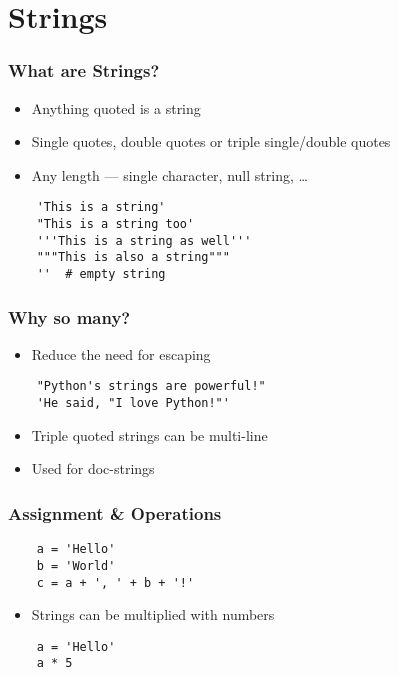 \section{Strings}

\begin{frame}[fragile]
  \frametitle{What are Strings?}
  \begin{itemize}
  \item Anything quoted is a string
  \item Single quotes, double quotes or triple single/double quotes
  \item Any length --- single character, null string, \ldots
  \end{itemize}
  \begin{lstlisting}
    'This is a string'
    "This is a string too'
    '''This is a string as well'''
    """This is also a string"""
    ''  # empty string
  \end{lstlisting}
\end{frame}

\begin{frame}[fragile]
  \frametitle{Why so many?}
  \begin{itemize}
  \item Reduce the need for escaping 
  \end{itemize}
  \begin{lstlisting}
    "Python's strings are powerful!"
    'He said, "I love Python!"'
  \end{lstlisting}
  \begin{itemize}
  \item Triple quoted strings can be multi-line
  \item Used for doc-strings
  \end{itemize}
\end{frame}

\begin{frame}[fragile]
  \frametitle{Assignment \& Operations}
  \begin{lstlisting}
    a = 'Hello'
    b = 'World'
    c = a + ', ' + b + '!'
  \end{lstlisting}
  \begin{itemize}
  \item Strings can be multiplied with numbers
  \end{itemize}
  \begin{lstlisting}
    a = 'Hello'
    a * 5
  \end{lstlisting}
\end{frame}


